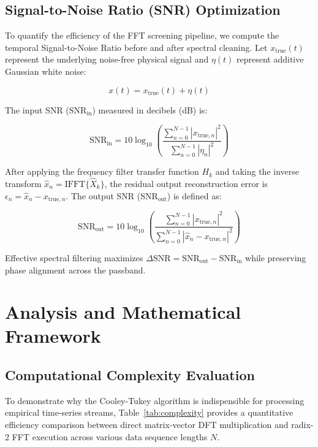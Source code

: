 \documentclass[11pt,a4paper]{article}
\begin{document}
\subsection{Signal-to-Noise Ratio (SNR) Optimization}

To quantify the efficiency of the FFT screening pipeline, we compute the temporal Signal-to-Noise Ratio before and after spectral cleaning. Let $x_{\text{true}}(t)$ represent the underlying noise-free physical signal and $\eta(t)$ represent additive Gaussian white noise:

\begin{equation}
x(t) = x_{\text{true}}(t) + \eta(t)
\end{equation}

The input SNR ($\text{SNR}_{\text{in}}$) measured in decibels (dB) is:

\begin{equation}
\text{SNR}_{\text{in}} = 10 \log_{10} \left( \frac{\sum_{n=0}^{N-1} |x_{\text{true}, n}|^2}{\sum_{n=0}^{N-1} |\eta_n|^2} \right)
\end{equation}

After applying the frequency filter transfer function $H_k$ and taking the inverse transform $\hat{x}_n = \text{IFFT}\{\hat{X}_k\}$, the residual output reconstruction error is $\epsilon_n = \hat{x}_n - x_{\text{true}, n}$. The output SNR ($\text{SNR}_{\text{out}}$) is defined as:

\begin{equation}
\text{SNR}_{\text{out}} = 10 \log_{10} \left( \frac{\sum_{n=0}^{N-1} |x_{\text{true}, n}|^2}{\sum_{n=0}^{N-1} |\hat{x}_n - x_{\text{true}, n}|^2} \right)
\end{equation}

Effective spectral filtering maximizes $\Delta \text{SNR} = \text{SNR}_{\text{out}} - \text{SNR}_{\text{in}}$ while preserving phase alignment across the passband.

\section{Analysis and Mathematical Framework}

\subsection{Computational Complexity Evaluation}

To demonstrate why the Cooley-Tukey algorithm is indispensible for processing empirical time-series streams, Table~\ref{tab:complexity} provides a quantitative efficiency comparison between direct matrix-vector DFT multiplication and radix-2 FFT execution across various data sequence lengths $N$.
\end{document}
